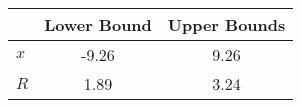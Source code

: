 \begin{tiny}\begin{tabular}{|l|c|c|}
\hline
&\textbf{Lower Bound}&\textbf{Upper Bounds}\\\hline
\textbf{$x$}&-9.26&9.26\\\hline
\textbf{$R$}&1.89&3.24\\\hline
\end{tabular}
\end{tiny}